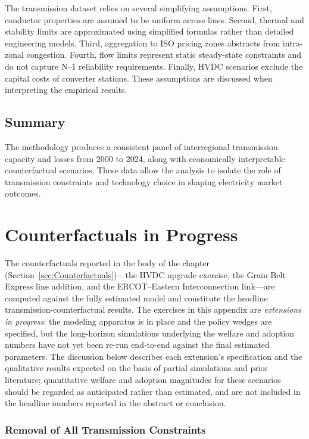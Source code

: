 \documentclass[12pt]{article}
\begin{document}
The transmission dataset relies on several simplifying assumptions. First, conductor properties are assumed to be uniform across lines. Second, thermal and stability limits are approximated using simplified formulas rather than detailed engineering models. Third, aggregation to ISO pricing zones abstracts from intra-zonal congestion. Fourth, flow limits represent static steady-state constraints and do not capture N--1 reliability requirements. Finally, HVDC scenarios exclude the capital costs of converter stations. These assumptions are discussed when interpreting the empirical results.

\subsection{Summary}

The methodology produces a consistent panel of interregional transmission capacity and losses from 2000 to 2024, along with economically interpretable counterfactual scenarios. These data allow the analysis to isolate the role of transmission constraints and technology choice in shaping electricity market outcomes.

\section{Counterfactuals in Progress}\label{sec:CounterfactualsInProgress}

The counterfactuals reported in the body of the chapter (Section~\ref{sec:Counterfactuals})---the HVDC upgrade exercise, the Grain Belt Express line addition, and the ERCOT--Eastern Interconnection link---are computed against the fully estimated model and constitute the headline transmission-counterfactual results. The exercises in this appendix are \textit{extensions in progress}: the modeling apparatus is in place and the policy wedges are specified, but the long-horizon simulations underlying the welfare and adoption numbers have not yet been re-run end-to-end against the final estimated parameters. The discussion below describes each extension's specification and the qualitative results expected on the basis of partial simulations and prior literature; quantitative welfare and adoption magnitudes for these scenarios should be regarded as anticipated rather than estimated, and are not included in the headline numbers reported in the abstract or conclusion.

\subsubsection{Removal of All Transmission Constraints}
\end{document}
